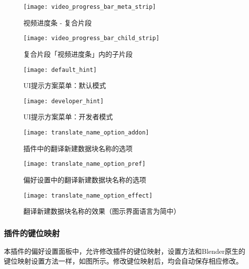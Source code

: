 \documentclass{../../public_resources/doc}
\begin{document}
\begin{figure}[h!]
    \begin{minipage}[t]{0.48\linewidth}
        \texttt{[image: video\_progress\_bar\_meta\_strip]}
        \caption{视频进度条 - 复合片段}
        \label{视频进度条复合片段}
    \end{minipage}
    \quad
    \begin{minipage}[t]{0.48\linewidth}
        \texttt{[image: video\_progress\_bar\_child\_strip]}
        \caption{复合片段「视频进度条」内的子片段}
        \label{视频进度条子片段}
    \end{minipage}

    \vspace{1ex}

    \begin{minipage}[t]{0.48\linewidth}
        \texttt{[image: default\_hint]}
        \caption{UI提示方案菜单：默认模式}
        \label{默认提示方案}
    \end{minipage}
    \quad
    \begin{minipage}[t]{0.48\linewidth}
        \texttt{[image: developer\_hint]}
        \caption{UI提示方案菜单：开发者模式}
        \label{开发者提示方案}
    \end{minipage}

    \vspace{1ex}

    \begin{minipage}[t]{0.45\linewidth}
        \texttt{[image: translate\_name\_option\_addon]}
        \caption{插件中的翻译新建数据块名称的选项}
        \label{插件的翻译名称选项}
    \end{minipage}
    \quad
    \begin{minipage}[t]{0.5\linewidth}
        \texttt{[image: translate\_name\_option\_pref]}
        \caption{偏好设置中的翻译新建数据块名称的选项}
        \label{偏好设置的的翻译名称选项}
    \end{minipage}
\end{figure}

\clearpage

\begin{figure}
    \texttt{[image: translate\_name\_option\_effect]}
    \caption{翻译新建数据块名称的效果（图示界面语言为简中）}
    \label{翻译名称的效果}
\end{figure}

\subsubsection{插件的键位映射}
\hypertarget{AddonKeymaps}{}
本插件的偏好设置面板中，允许修改插件的键位映射，设置方法和Blender原生的键位映射设置方法一样，如图所示。修改键位映射后，均会自动保存相应修改。
\end{document}
